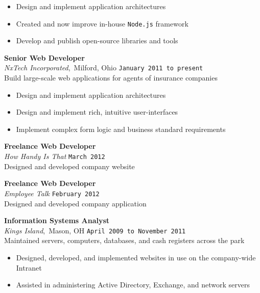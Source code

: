 \documentclass[11pt, line]{res}
\begin{document}
\begin{resume}
				\begin{itemize}
					\item Design and implement application architectures
					\item Created and now improve in-house \texttt{Node.js} framework
					\item Develop and publish open-source libraries and tools
				\end{itemize}

			\vspace{-4pt}
				\textbf{Senior Web Developer} \\
				\textit{NxTech Incorporated},\, Milford, Ohio
					\hfill \texttt{January 2011 to present} \\
				Build large-scale web applications for agents of insurance companies

				\begin{itemize}
					\item Design and implement application architectures
					\item Design and implement rich, intuitive user-interfaces
					\item Implement complex form logic and business standard requirements
				\end{itemize}

			\vspace{-4pt}
				\textbf{Freelance Web Developer} \\
				\textit{How Handy Is That}
					\hfill \texttt{March 2012} \\
				Designed and developed company website

			\vspace{-4pt}
				\textbf{Freelance Web Developer} \\
				\textit{Employee Talk}
					\hfill \texttt{February 2012} \\
				Designed and developed company application

			\vspace{-4pt}
				\textbf{Information Systems Analyst} \\
				\textit{Kings Island},\, Mason, OH
					\hfill \texttt{April 2009 to November 2011} \\
				Maintained servers, computers, databases, and cash registers across the park

				\begin{itemize}
					\item Designed, developed, and implemented websites in use on the company-wide Intranet
					\item Assisted in administering Active Directory, Exchange, and network servers
				\end{itemize}
	\end{resume}
\end{document}
